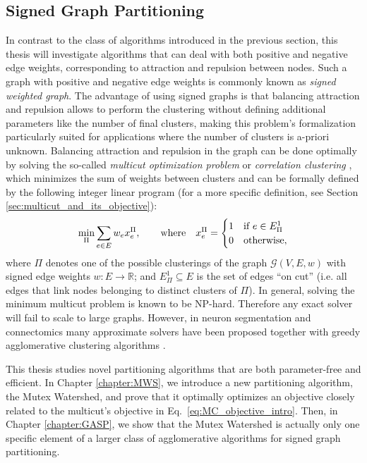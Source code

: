\subsection{Signed Graph Partitioning}
In contrast to the class of algorithms introduced in the previous section, this thesis will investigate algorithms that can
deal with both positive and negative edge weights, corresponding to attraction and repulsion between nodes. Such a graph with positive and negative edge weights is commonly known as \emph{signed weighted graph}. The advantage of using signed graphs is that balancing attraction and repulsion allows to perform the clustering without defining additional parameters like the number of final clusters, making this problem's formalization particularly suited for applications where the number of clusters is a-priori unknown. Balancing attraction and repulsion in the graph can be done optimally by solving the so-called \emph{multicut optimization problem} or \emph{correlation clustering} \cite{kappes2011globally,chopra1991multiway}, which minimizes the sum of weights between clusters and can be formally defined by the following integer linear program (for a more specific definition, see Section \ref{sec:multicut_and_its_objective}):
\begin{equation}\label{eq:MC_objective_intro}
 \min_\Pi \sum_{e\in E} w_e x_e^\Pi,  \qquad \text{where} \quad x^\Pi_e = 
 \begin{cases} 
 1 & \text{if } e\in E^1_\Pi \\
 0 & \text{otherwise},
 \end{cases}
\end{equation}
where $\Pi$ denotes one of the possible clusterings of the graph $\mathcal{G}(V,E,w)$ with signed edge weights $w:E\rightarrow \mathbb{R}$; and $E_\Pi^1 \subseteq E$ is the set of edges ``on cut'' (i.e. all edges that link nodes belonging to distinct clusters of $\Pi$). 
In general, solving the minimum multicut problem is known to be NP-hard. Therefore any exact solver will fail to scale to large graphs. However, in neuron segmentation and connectomics many approximate solvers have been proposed \cite{lange2018combinatorial,pape2017solving,beier2016efficient,yarkony2012fast} together with greedy agglomerative clustering algorithms \cite{keuper2015efficient,levinkov2017comparative,kardoostsolving}. 

This thesis studies novel partitioning algorithms that are both parameter-free and efficient. In Chapter \ref{chapter:MWS}, we introduce a new partitioning algorithm, the Mutex Watershed, and prove that it optimally optimizes an objective closely related to the multicut's objective in Eq.~\ref{eq:MC_objective_intro}. Then, in Chapter \ref{chapter:GASP}, we show that the Mutex Watershed is actually only one specific element of a larger class of agglomerative algorithms for signed graph partitioning.



